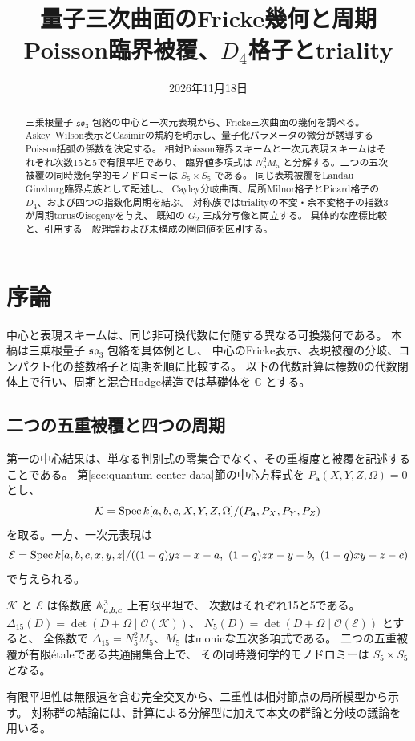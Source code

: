 \documentclass[11pt,a4paper]{ltjsarticle}
\title{量子三次曲面のFricke幾何と周期\\
\large Poisson臨界被覆、$D_4$格子とtriality}
\author{}
\date{2026年11月18日\quad \PublicationVersion}
\begin{document}
\maketitle
\begin{abstract}
三乗根量子 $\mathfrak{so}_3$ 包絡の中心と一次元表現から、Fricke三次曲面の幾何を調べる。
Askey--Wilson表示とCasimirの規約を明示し、量子化パラメータの微分が誘導する
Poisson括弧の係数を決定する。
相対Poisson臨界スキームと一次元表現スキームはそれぞれ次数15と5で有限平坦であり、
臨界値多項式は $N_5^2M_5$ と分解する。二つの五次被覆の同時幾何学的モノドロミーは
$S_5\times S_5$ である。
同じ表現被覆をLandau--Ginzburg臨界点族として記述し、
Cayley分岐曲面、局所Milnor格子とPicard格子の $D_4$、および四つの指数化周期を結ぶ。
対称族ではtrialityの不変・余不変格子の指数3が周期torusのisogenyを与え、
既知の $G_2$ 三成分写像と両立する。
具体的な座標比較と、引用する一般理論および未構成の圏同値を区別する。
\end{abstract}

\section{序論}\label{sec:fricke-introduction}
中心と表現スキームは、同じ非可換代数に付随する異なる可換幾何である。
本稿は三乗根量子 $\mathfrak{so}_3$ 包絡を具体例とし、
中心のFricke表示、表現被覆の分岐、コンパクト化の整数格子と周期を順に比較する。
以下の代数計算は標数0の代数閉体上で行い、周期と混合Hodge構造では基礎体を $\mathbb C$ とする。

\subsection{二つの五重被覆と四つの周期}
第一の中心結果は、単なる判別式の零集合でなく、その重複度と被覆を記述することである。
第\ref{sec:quantum-center-data}節の中心方程式を $P_{\mathbf a}(X,Y,Z,\Omega)=0$ とし、
\[
 \mathcal K=\Spec k[a,b,c,X,Y,Z,\Omega]/(P_{\mathbf a},P_X,P_Y,P_Z)
\]
を取る。一方、一次元表現は
\[
 \mathcal E=\Spec k[a,b,c,x,y,z]/
 ((1-q)yz-x-a,\ (1-q)zx-y-b,\ (1-q)xy-z-c)
\]
で与えられる。
\begin{theorem}
$\mathcal K$ と $\mathcal E$ は係数底 $\AA^3_{a,b,c}$ 上有限平坦で、
次数はそれぞれ15と5である。
$\Delta_{15}(D)=\det(D+\Omega\mid\mathcal O(\mathcal K))$、
$N_5(D)=\det(D+\Omega\mid\mathcal O(\mathcal E))$ とすると、
全係数で $\Delta_{15}=N_5^2M_5$、$M_5$ はmonicな五次多項式である。
二つの五重被覆が有限\'etaleである共通開集合上で、
その同時幾何学的モノドロミーは $S_5\times S_5$ となる。
\end{theorem}
有限平坦性は無限遠を含む完全交叉から、二重性は相対節点の局所模型から示す。
対称群の結論には、計算による分解型に加えて本文の群論と分岐の議論を用いる。
\end{document}
